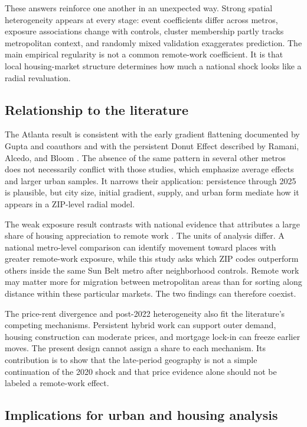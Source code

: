 \documentclass[11pt]{article}
\begin{document}
These answers reinforce one another in an unexpected way. Strong spatial heterogeneity appears at every stage: event coefficients
differ across metros, exposure associations change with controls, cluster membership partly tracks metropolitan context, and
randomly mixed validation exaggerates prediction. The main empirical regularity is not a common remote-work coefficient. It is
that local housing-market structure determines how much a national shock looks like a radial revaluation.

\subsection{Relationship to the literature}

The Atlanta result is consistent with the early gradient flattening documented by Gupta and coauthors and with the persistent
Donut Effect described by Ramani, Alcedo, and Bloom \cite{gupta2022flattening,ramani2024reshapes}. The absence of the same pattern in
several other metros does not necessarily conflict with those studies, which emphasize average effects and larger urban samples.
It narrows their application: persistence through 2025 is plausible, but city size, initial gradient, supply, and urban form mediate
how it appears in a ZIP-level radial model.

The weak exposure result contrasts with national evidence that attributes a large share of housing appreciation to remote work
\cite{mondragon2022housing}. The units of analysis differ. A national metro-level comparison can identify movement toward places
with greater remote-work exposure, while this study asks which ZIP codes outperform others inside the same Sun Belt metro after
neighborhood controls. Remote work may matter more for migration between metropolitan areas than for sorting along distance within
these particular markets. The two findings can therefore coexist.

The price-rent divergence and post-2022 heterogeneity also fit the literature's competing mechanisms. Persistent hybrid work can
support outer demand, housing construction can moderate prices, and mortgage lock-in can freeze earlier moves. The present design
cannot assign a share to each mechanism. Its contribution is to show that the late-period geography is not a simple continuation
of the 2020 shock and that price evidence alone should not be labeled a remote-work effect.

\subsection{Implications for urban and housing analysis}
\end{document}
